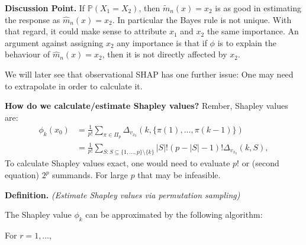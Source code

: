 \documentclass[
]{book}
\begin{document}
\textbf{Discussion Point.} If \(\mathbb P(X_1=X_2)\), then \(\tilde m_n(x)=x_2\) is as good in estimating the response as \(\hat m_n(x)=x_2\). In particular the Bayes rule is not unique. With that regard, it could make sense to attribute \(x_1\) and \(x_2\) the same importance. An argument against assigning \(x_2\) any importance is that if \(\phi\) is to explain the behaviour of \(\hat m_n(x)=x_2\), then it is not directly affected by \(x_2\).

We will later see that observational SHAP has one further issue: One may need to extrapolate in order to calculate it.

\textbf{How do we calculate/estimate Shapley values?} Rember, Shapley values are:
\begin{align}
\phi_{k}(x_0)&=\frac{1}{p !} \sum_{\pi \in \Pi_p} \Delta_{v_{x_0}}\left(k, \{\pi(1),\dots,\pi(k-1)\}\right)\\
&=\frac 1 {p!}\sum_{S: S \subseteq \{1,\dots,p\} \setminus\{k\}} {|S| !(p -|S|-1) !}\Delta_{v_{x_0}}(k, S),
\end{align}
To calculate Shapley values exact, one would need to evaluate \(p!\) or (second equation) \(2^p\) summands. For large \(p\) that may be infeasible.

\textbf{Definition.} \emph{(Estimate Shapley values via permutation sampling)}

The Shapley value \(\phi_k\) can be approximated by the following algorithm:

For \(r=1,\dots\),
\end{document}

